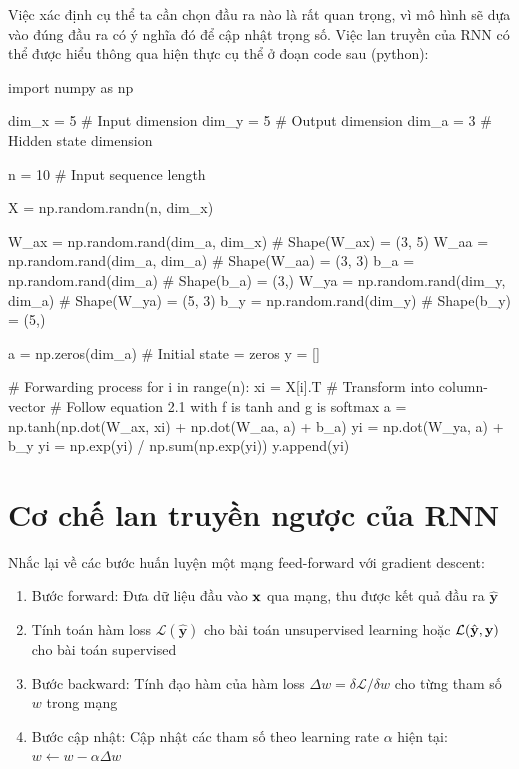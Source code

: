 Việc xác định cụ thể ta cần chọn đầu ra nào là rất quan trọng, vì mô hình sẽ dựa vào đúng đầu ra có ý nghĩa đó để cập nhật trọng số. Việc lan truyền của RNN có thể được hiểu thông qua hiện thực cụ thể ở đoạn code sau (python):
\begin{python}
    import numpy as np

    dim_x = 5  # Input dimension
    dim_y = 5  # Output dimension
    dim_a = 3  # Hidden state dimension

    n = 10  # Input sequence length

    X = np.random.randn(n, dim_x)

    W_ax = np.random.rand(dim_a, dim_x)  # Shape(W_ax) = (3, 5)
    W_aa = np.random.rand(dim_a, dim_a)  # Shape(W_aa) = (3, 3)
    b_a = np.random.rand(dim_a)          # Shape(b_a)  = (3,)
    W_ya = np.random.rand(dim_y, dim_a)  # Shape(W_ya) = (5, 3)
    b_y = np.random.rand(dim_y)          # Shape(b_y)  = (5,)

    a = np.zeros(dim_a)  # Initial state = zeros
    y = []

    # Forwarding process
    for i in range(n):
        xi = X[i].T  # Transform into column-vector
        # Follow equation 2.1 with f is tanh and g is softmax
        a = np.tanh(np.dot(W_ax, xi) + np.dot(W_aa, a) + b_a)
        yi = np.dot(W_ya, a) + b_y
        yi = np.exp(yi) / np.sum(np.exp(yi))
        y.append(yi)
\end{python}

\section{Cơ chế lan truyền ngược của RNN}
Nhắc lại về các bước huấn luyện một mạng feed-forward với gradient descent:
\begin{enumerate}
    \item Bước forward: Đưa dữ liệu đầu vào $\textbf x$ qua mạng, thu được kết quả đầu ra $\hat{\textbf{y}}$
    \item Tính toán hàm loss $\mathcal{L}(\hat{\textbf{y}})$ cho bài toán unsupervised learning hoặc $\mathcal{L}(\hat{\textbf{y}},\textbf y)$ cho bài toán supervised
    \item Bước backward: Tính đạo hàm của hàm loss $\Delta w = \delta \mathcal{L} / \delta w$ cho từng tham số $w$ trong mạng
    \item Bước cập nhật: Cập nhật các tham số theo learning rate $\alpha$ hiện tại: $w \leftarrow w - \alpha\Delta w$
\end{enumerate}

